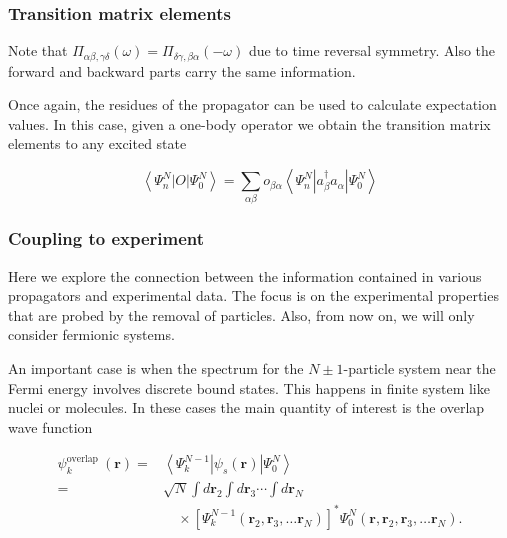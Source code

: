 \documentclass[compress]{beamer}
\begin{document}
{
\frametitle{Transition matrix elements}
\begin{small}
{\scriptsize
Note that $\Pi_{\alpha \beta, \gamma \delta}(\omega)=\Pi_{\delta
  \gamma, \beta \alpha}(-\omega)$ due to time reversal symmetry. Also
the forward and backward parts carry the same information.

Once again, the residues of the propagator can be used to
calculate expectation values. In this case, given a one-body operator
we obtain the transition matrix elements to any excited state

$$
\left\langle\Psi_{n}^{N}|O| \Psi_{0}^{N}\right\rangle=\sum_{\alpha \beta} o_{\beta \alpha}\left\langle\Psi_{n}^{N}\left|a_{\beta}^{\dagger} a_{\alpha}\right| \Psi_{0}^{N}\right\rangle
$$

}
\end{small}
}
\frame
{
\frametitle{Coupling to experiment}
\begin{small}
{\scriptsize


Here we explore the connection between the information contained in
various propagators and experimental data. The focus is on the
experimental properties that are probed by the removal of
particles. Also, from now on, we will only consider fermionic systems.

An important case is when the spectrum for the $N \pm 1$-particle
system near the Fermi energy involves discrete bound states. This
happens in finite system like nuclei or molecules. In these cases the
main quantity of interest is the overlap wave function

$$
\begin{aligned}
\psi_{k}^{\text {overlap }}(\mathbf{r})= & \left\langle\Psi_{k}^{N-1}\left|\psi_{s}(\mathbf{r})\right| \Psi_{0}^{N}\right\rangle \\
= & \sqrt{N} \int d \mathbf{r}_{2} \int d \mathbf{r}_{3} \cdots \int d \mathbf{r}_{N} \\
& \quad \times\left[\Psi_{k}^{N-1}\left(\mathbf{r}_{2}, \mathbf{r}_{3}, \ldots \mathbf{r}_{N}\right)\right]^{*} \Psi_{0}^{N}\left(\mathbf{r}, \mathbf{r}_{2}, \mathbf{r}_{3}, \ldots \mathbf{r}_{N}\right) .
\end{aligned}
$$

}
\end{small}
}
\frame
\end{document}
